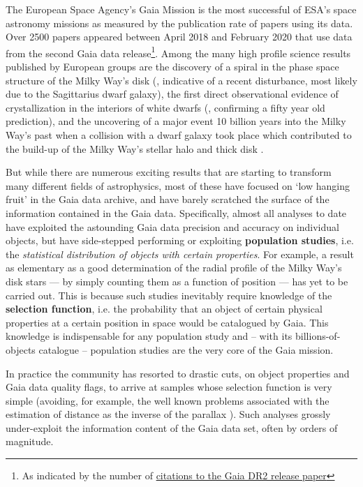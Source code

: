 The European Space Agency's Gaia Mission \cite{2016A&A...595A...1G} is the most successful of ESA's space astronomy missions as measured by the publication rate of papers using its data. Over 2500 papers appeared between April 2018 and February 2020 that use data from the second Gaia data release\footnote{As indicated by the number of  \href{https://ui.adsabs.harvard.edu/search/q=citations(bibcode\%3A2018A\%26A...616A...1G)&sort=date\%20desc\%2C\%20bibcode\%20desc&p_=0}{citations to the Gaia DR2 release paper}}. Among the many high profile science results published by European groups are the discovery of a spiral in the phase space structure of the Milky Way's disk (\cite{2018Natur.561..360A}, indicative of a recent disturbance, most likely due to the Sagittarius dwarf galaxy), the first direct observational evidence of crystallization in the interiors of white dwarfs (\cite{2019Natur.565..202T}, confirming a fifty year old prediction), and the uncovering of a major event 10 billion years into the Milky Way's past when a collision with a dwarf galaxy took place which contributed to the build-up of the Milky Way's stellar halo and thick disk \cite{2018Natur.563...85H, 2018MNRAS.478..611B, 2019arXiv190904679B}. 

But while there are numerous exciting results that are starting to transform many different fields of astrophysics, most of these have focused on `low hanging fruit' in the Gaia data archive, and have barely scratched the surface of the information contained in the Gaia data. Specifically, almost all analyses to date have exploited the astounding Gaia data precision and accuracy on individual objects, but have side-stepped performing or exploiting \textbf{population studies}, i.e. the \textsl{statistical distribution of objects with certain properties}. For example, a result as elementary as a good determination of the radial profile of the Milky Way's disk stars --- by simply counting them as a function of position --- has yet to be carried out. This is because such studies inevitably require knowledge of the \textbf{selection function}, i.e. the probability that an object of certain physical properties at a certain position in space would be catalogued by Gaia. This knowledge is indispensable for any population study and -- with its billions-of-objects catalogue -- population studies are the very core of the Gaia mission.

In practice the community has resorted to drastic cuts, on object properties and Gaia data quality flags, to arrive at samples whose selection function is very simple (avoiding, for example, the well known problems associated with the estimation of distance as the inverse of the parallax \cite{2018A&A...616A...9L}). Such analyses grossly under-exploit the information content of the Gaia data set, often by orders of magnitude.


